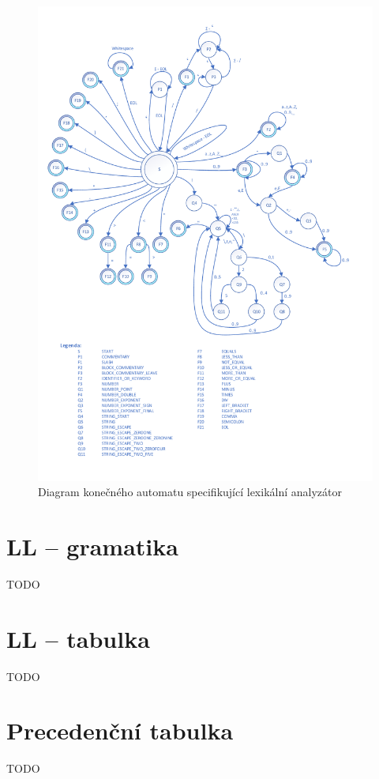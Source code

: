 \documentclass[a4paper, 11pt]{article}
\begin{document}
	\begin{figure}[!ht]
		\centering
		\vspace{-1.2cm}
		\includegraphics[width=0.95\linewidth]{inc/FA_graph.pdf}
		\caption{Diagram konečného automatu specifikující lexikální analyzátor}
		\label{figure:fa_graph}
	\end{figure}
	\clearpage

	\section{LL -- gramatika}

	TODO


	\section{LL -- tabulka}

	TODO


	\section{Precedenční tabulka}

	TODO
\end{document}
